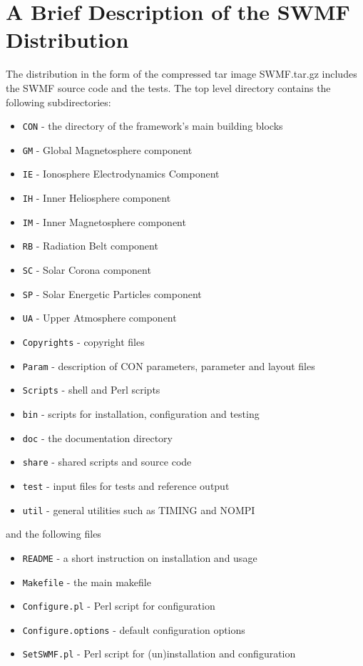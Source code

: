 \section{A Brief Description of the SWMF Distribution}

The distribution in the form of the compressed tar image
SWMF.tar.gz includes the SWMF source code and the tests.
The top level directory contains the following subdirectories:
\begin{itemize}
\item {\tt CON}     - the directory of the framework's main building blocks
\item {\tt GM}      - Global Magnetosphere component       %
\item {\tt IE}      - Ionosphere Electrodynamics Component %
\item {\tt IH}      - Inner Heliosphere component          %
\item {\tt IM}      - Inner Magnetosphere component        %
\item {\tt RB}      - Radiation Belt component             %
\item {\tt SC}      - Solar Corona component               %
\item {\tt SP}      - Solar Energetic Particles component  %
\item {\tt UA}      - Upper Atmosphere component           %
\item {\tt Copyrights} - copyright files
\item {\tt Param}   - description of CON parameters, parameter and layout files
\item {\tt Scripts} - shell and Perl scripts
\item {\tt bin}     - scripts for installation, configuration and testing
\item {\tt doc}     - the documentation directory %
\item {\tt share}   - shared scripts and source code
\item {\tt test}    - input files for tests and reference output
\item {\tt util}    - general utilities such as TIMING and NOMPI
\end{itemize}
and the following files
\begin{itemize}
\item {\tt README}           - a short instruction on installation and usage
\item {\tt Makefile}         - the main makefile
\item {\tt Configure.pl}     - Perl script for configuration %
\item {\tt Configure.options} - default configuration options %
\item {\tt SetSWMF.pl}     - Perl script for (un)installation and configuration
\end{itemize}

